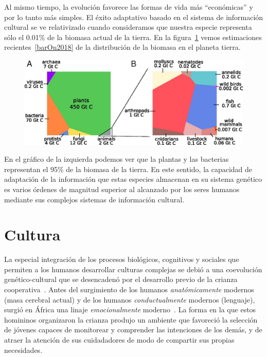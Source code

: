 \documentclass[a4paper,10pt]{book}
\theoremstyle{definition}
\newif\ifes
\newcommand{\es}[1]{\ifes#1\fi}
\begin{document}

Al mismo tiempo, la evolución favorece las formas de vida más ``económicas'' y por lo tanto más simples.
El éxito adaptativo basado en el sistema de información cultural se ve relativizado cuando consideramos que nuestra especie representa sólo el 0.01\% de la biomasa actual de la tierra.
En la figura~\ref{fig:biomass} vemos estimaciones recientes~\ref{barOn2018} de la distribución de la biomasa en el planeta tierra.
\begin{figure}[ht!]
    \centering
    \includegraphics[width=0.7\linewidth]{static/biomass}
    \caption{
    \es{Distribución de la biomasa en el planeta tierra. }%
    }
    \label{fig:biomass}
\end{figure}
En el gráfico de la izquierda podemos ver que la plantas y las bacterias representan el 95\% de la biomasa de la tierra.
En este sentido, la capacidad de adaptación de la información que estas especies almacenan en su sistema genético es varios órdenes de magnitud superior al alcanzado por los seres humanos mediante sus complejos sistemas de información cultural.

\section{Cultura}

La especial integraci\'on de los procesos biol\'ogicos, cognitivos y sociales que permiten a los humanos desarrollar culturas complejas se debió a una coevolución genético-cultural que se desencadenó por el desarrollo previo de la crianza cooperativa~\cite{hrdy2020-emotionallyModern}.
Antes del surgimiento de los humanos \emph{anatómicamente} modernos (masa cerebral actual) y de los humanos \emph{conductualmente} modernos (lenguaje), surgió en África una linaje \emph{emocionalmente} moderno~\cite{hrdy2020-emotionallyModern}.
La forma en la que estos homininos organizaron la crianza produjo un ambiente que favoreció la selección de jóvenes capaces de monitorear y comprender las intenciones de los demás, y de atraer la atención de sus cuidadadores de modo de compartir sus propias necesidades.
\end{document}
